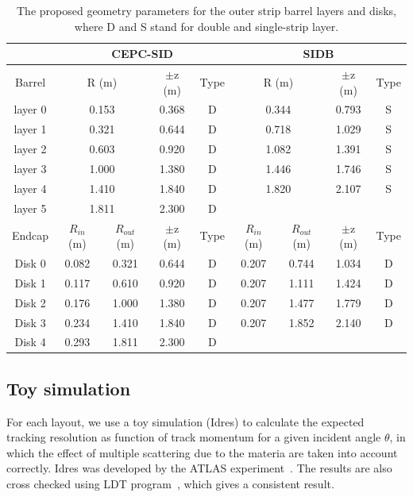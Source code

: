 \begin{table}[htb]
\caption{ The proposed geometry parameters for the outer strip barrel layers and disks,  where D and S stand for 
double and single-strip layer.}
\begin{center}
\begin{tabular}{|c|c|c|c|c|c|c|c|c|} \hline\hline
        & \multicolumn{4}{|c|}{CEPC-SID}          & \multicolumn{4}{|c|}{SIDB} \\ \hline 
Barrel  & \multicolumn{2}{|c|}{R (m)} & $\pm$z (m) & Type &  \multicolumn{2}{|c|}{R (m)} & $\pm$z (m) & Type  \\ \hline 
layer 0 & \multicolumn{2}{|c|}{0.153} & 0.368 & D  & \multicolumn{2}{|c|}{0.344} & 0.793 & S  \\  
layer 1 & \multicolumn{2}{|c|}{0.321} & 0.644 & D  & \multicolumn{2}{|c|}{0.718} & 1.029 & S  \\ 
layer 2 & \multicolumn{2}{|c|}{0.603} & 0.920 & D  & \multicolumn{2}{|c|}{1.082} & 1.391 & S  \\ 
layer 3 & \multicolumn{2}{|c|}{1.000} & 1.380 & D  & \multicolumn{2}{|c|}{1.446} & 1.746 & S  \\
layer 4 & \multicolumn{2}{|c|}{1.410} & 1.840 & D  & \multicolumn{2}{|c|}{1.820} & 2.107 & S  \\\hline 
layer 5 & \multicolumn{2}{|c|}{1.811} & 2.300 & D  & \multicolumn{4}{|c|}{} \\ \hline 
Endcap  & $R_{in}$ (m) & $R_{out}$ (m) & $\pm$z (m) & Type & $R_{in}$ (m) & $R_{out}$ (m) & $\pm$z (m) & Type \\ \hline 
Disk 0  & 0.082 & 0.321 & 0.644 & D & 0.207 & 0.744 & 1.034 & D \\
Disk 1  & 0.117 & 0.610 & 0.920 & D & 0.207 & 1.111 & 1.424 & D \\
Disk 2  & 0.176 & 1.000 & 1.380 & D & 0.207 & 1.477 & 1.779 & D \\
Disk 3  & 0.234 & 1.410 & 1.840 & D & 0.207 & 1.852 & 2.140 & D \\ \hline
Disk 4  & 0.293 & 1.811 & 2.300 & D & \multicolumn{4}{|c|}{} \\ \hline
\hline\hline
\end{tabular}
\end{center}
\label{tab:fullsistrips}
\end{table}

\subsection{Toy simulation} 
For each layout, we use a toy simulation (Idres) to calculate the expected tracking resolution as
function of track momentum for a given incident angle $\theta$, in which the effect of multiple
scattering due to the materia are taken into account correctly. Idres was developed by the ATLAS experiment~\cite{Calace:2015idres}. 
The results are also cross checked using LDT program~\cite{Regler:2008ldt}, which gives a consistent result.

